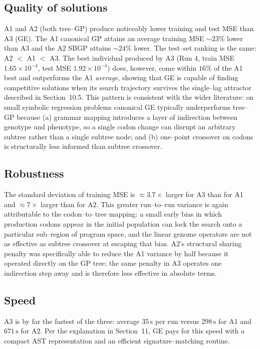\documentclass[12pt,a4paper]{article}
\begin{document}
\subsection{Quality of solutions}
A1 and A2 (both tree--GP) produce noticeably lower training and test
MSE than A3 (GE). The A1 canonical GP attains an average training MSE
$\sim23\%$ lower than A3 and the A2 SBGP attains $\sim24\%$ lower. The
test--set ranking is the same: A2 $<$ A1 $<$ A3. The best individual
produced by A3 (Run 4, train MSE $1.65\times 10^{-4}$, test MSE
$1.92\times 10^{-4}$) does, however, come within $16\%$ of the A1 best
and outperforms the A1 \emph{average}, showing that GE is capable of
finding competitive solutions when its search trajectory survives the
single--lag attractor described in Section~10.5. This pattern is
consistent with the wider literature: on small symbolic regression
problems canonical GE typically underperforms tree--GP because (a)
grammar mapping introduces a layer of indirection between genotype and
phenotype, so a single codon change can disrupt an arbitrary subtree
rather than a single subtree node; and (b) one--point crossover on
codons is structurally less informed than subtree crossover.

\subsection{Robustness}
The standard deviation of training MSE is $\approx 3.7\times$ larger
for A3 than for A1 and $\approx 7\times$ larger than for A2. This
greater run--to--run variance is again attributable to the
codon--to--tree mapping: a small early bias in which production codons
appear in the initial population can lock the search onto a particular
sub--region of program space, and the linear genome operators are not
as effective as subtree crossover at escaping that bias. A2's
structural sharing penalty was specifically able to reduce the A1
variance by half because it operated directly on the GP tree; the same
penalty in A3 operates one indirection step away and is therefore less
effective in absolute terms.

\subsection{Speed}
A3 is by far the fastest of the three: average $35\,\text{s}$ per run
versus $298\,\text{s}$ for A1 and $671\,\text{s}$ for A2. Per the
explanation in Section~11, GE pays for this speed with a compact AST
representation and an efficient signature--matching routine.
\end{document}
